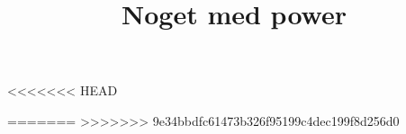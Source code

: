 

\title{Noget med power}
\date{}

<<<<<<< HEAD
	\maketitle
=======
>>>>>>> 9e34bbdfc61473b326f95199c4dec199f8d256d0
			
			
			

